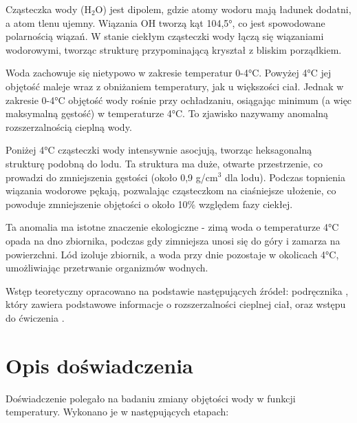 \documentclass[a4paper,12pt]{article}
\begin{document}
Cząsteczka wody (H$_2$O) jest dipolem, gdzie atomy wodoru mają ładunek dodatni, a atom tlenu ujemny. Wiązania OH tworzą kąt 104,5°, co jest spowodowane polarnością wiązań. W stanie ciekłym cząsteczki wody łączą się wiązaniami wodorowymi, tworząc strukturę przypominającą kryształ z bliskim porządkiem.

Woda zachowuje się nietypowo w zakresie temperatur 0-4°C. Powyżej 4°C jej objętość maleje wraz z obniżaniem temperatury, jak u większości ciał. Jednak w zakresie 0-4°C objętość wody rośnie przy ochładzaniu, osiągając minimum (a więc maksymalną gęstość) w temperaturze 4°C. To zjawisko nazywamy anomalną rozszerzalnością cieplną wody.

Poniżej 4°C cząsteczki wody intensywnie asocjują, tworząc heksagonalną strukturę podobną do lodu. Ta struktura ma duże, otwarte przestrzenie, co prowadzi do zmniejszenia gęstości (około 0,9 g/cm$^3$ dla lodu). Podczas topnienia wiązania wodorowe pękają, pozwalając cząsteczkom na ciaśniejsze ułożenie, co powoduje zmniejszenie objętości o około 10\% względem fazy ciekłej.

Ta anomalia ma istotne znaczenie ekologiczne - zimą woda o temperaturze 4°C opada na dno zbiornika, podczas gdy zimniejsza unosi się do góry i zamarza na powierzchni. Lód izoluje zbiornik, a woda przy dnie pozostaje w okolicach 4°C, umożliwiając przetrwanie organizmów wodnych.

Wstęp teoretyczny opracowano na podstawie następujących źródeł: podręcznika \cite{fizyka_dla_szkół_wyższych_tom_2}, który zawiera podstawowe informacje o rozszerzalności cieplnej ciał, oraz wstępu do ćwiczenia \cite{lab29manual}.

\section{Opis doświadczenia}

Doświadczenie polegało na badaniu zmiany objętości wody w funkcji temperatury. Wykonano je w następujących etapach:
\end{document}
